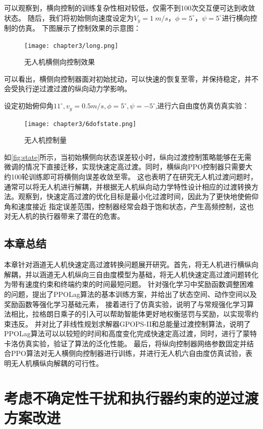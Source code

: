 可以观察到，横向控制的训练复杂性相对较低，仅需不到100次交互便可达到收敛状态。
随后，我们将初始侧向速度设定为$V_{y}=1 \ m/s$，$\phi=5^{\circ}$，$\psi=5^{\circ}$进行横向控制的仿真。
下图展示了控制效果的示意图：
\begin{figure}[H]
    \centering
    \texttt{[image: chapter3/long.png]}
    \caption{\label{fig:tecs}无人机横侧向控制效果}
    \label{fig:state}
\end{figure}

可以看出，横侧向控制器面对初始扰动，可以快速的恢复至零，并保持稳定，并不会受执行逆过渡过渡的纵向动力学影响。

设定初始俯仰角$11^{\circ},v_{y}=0.5m/s,\phi=5^{\circ},\psi=-5^{\circ}$,进行六自由度仿真仿真实验：
\begin{figure}[htb]
    \centering
    \texttt{[image: chapter3/6dofstate.png]}
    \caption{\label{fig:tecs}无人机控制量}
    \label{fig:action}
\end{figure}
如\autoref{fig:state}所示，当初始横侧向状态误差较小时，纵向过渡控制策略能够在无需微调的情况下直接迁移，实现快速定高过渡。同时，横纵向PPO控制器只需要大约100轮训练即可将横侧向误差收敛至零。
这也表明了在研究无人机过渡问题时，通常可以将无人机进行解耦，并根据无人机纵向动力学特性设计相应的过渡转换方法。观察到，快速定高过渡的优化目标是最小化过渡时间，因此为了更快地使俯仰角和速度接近
指定误差范围，控制器经常会趋于饱和状态，产生高频控制，这也对无人机的执行器带来了潜在的危害。

\section{本章总结}
本章针对涵道无人机快速定高过渡转换问题展开研究。首先，将无人机进行横纵向解耦，并以涵道无人机纵向三自由度模型为基础，将无人机快速定高过渡问题转化为带有速度约束和终端约束的时间最短问题。
针对强化学习中奖励函数调整困难的问题，提出了PPOLag算法的基本训练方案，并给出了状态空间、动作空间以及奖励函数等强化学习基础元素，
接着进行了仿真实验，说明了与常规强化学习算法相比，拉格朗日乘子的引入可以帮助智能体更好地权衡惩罚与奖励，以实现零约束违反。
并对比了非线性规划求解器GPOPS-II和总能量过渡控制算法，说明了PPOLag算法可以以较短的时间和高度变化完成快速定高过渡，同时，进行了蒙特卡洛仿真实验，验证了算法的泛化性能。
最后，将纵向控制器网络参数固定并结合PPO算法对无人横侧向控制器进行训练，并进行无人机六自由度仿真试验，表明无人机横纵向解耦的可行性。

\chapter{考虑不确定性干扰和执行器约束的逆过渡方案改进}
